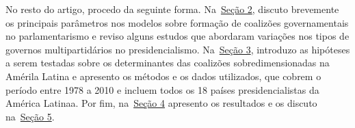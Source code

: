 No resto do artigo, procedo da seguinte forma. Na~\hyperref[chap:revisao]{Seção 2}, discuto brevemente os principais parâmetros nos modelos sobre formação de coalizões governamentais no parlamentarismo e reviso alguns estudos que abordaram variações nos tipos de governos multipartidários no presidencialismo. Na~\hyperref[chap:analise]{Seção 3}, introduzo as hipóteses a serem testadas sobre os determinantes das coalizões sobredimensionadas na Amérila Latina e apresento os métodos e os dados utilizados, que cobrem o período entre 1978 a 2010 e incluem todos os 18 países presidencialistas da América Latinaa. Por fim, na~\hyperref[chap:resultados]{Seção 4} apresento os resultados e os discuto na~\hyperref[chap:discussao]{Seção 5}.
